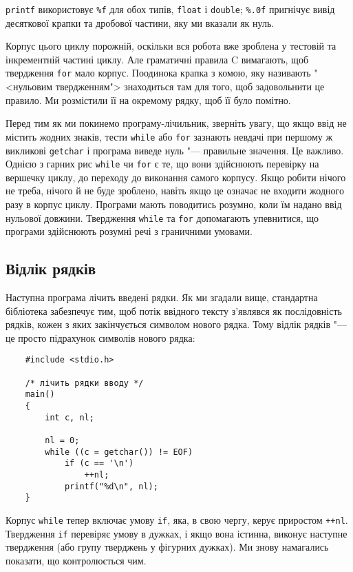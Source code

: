 \documentclass[a4paper,12pt]{book}
\begin{document}
  \texttt{printf} використовує \texttt{\%f} для обох типів, \texttt{float} і
  \texttt{double}; \texttt{\%.0f} пригнічує вивід десяткової крапки та дробової частини,
  яку ми вказали як нуль.

  Корпус цього циклу порожній, оскільки вся робота вже зроблена у тестовій та інкрементній
  частині циклу. Але граматичні правила C вимагають, щоб твердження \texttt{for} мало
  корпус. Поодинока крапка з комою, яку називають "<нульовим твердженням">
  знаходиться там для того, щоб задовольнити це правило. Ми розмістили її на окремому
  рядку, щоб її було помітно.

  Перед тим як ми покинемо програму-лічильник, зверніть увагу, що якщо ввід не містить
  жодних знаків, тести \texttt{while} або \texttt{for} зазнають невдачі при першому ж
  викликові \texttt{getchar} і програма виведе нуль "--- правильне значення. Це
  важливо. Однією з гарних рис \texttt{while} чи \texttt{for} є те, що вони здійснюють
  перевірку на вершечку циклу, до переходу до виконання самого корпусу. Якщо робити нічого
  не треба, нічого й не буде зроблено, навіть якщо це означає не входити жодного разу в
  корпус циклу. Програми мають поводитись розумно, коли їм надано ввід нульової довжини.
  Твердження \texttt{while} та \texttt{for} допомагають упевнитися, що програми здійснюють
  розумні речі з граничними умовами.

\subsection{Відлік рядків}


  Наступна програма лічить введені рядки. Як ми згадали вище, стандартна бібліотека
  забезпечує тим, щоб потік ввідного тексту з'являвся як послідовність рядків, кожен з
  яких закінчується символом нового рядка. Тому відлік рядків "--- це просто підрахунок
  символів нового рядка:
  \begin{verbatim}
    #include <stdio.h>

    /* лічить рядки вводу */
    main()
    {
        int c, nl;

        nl = 0;
        while ((c = getchar()) != EOF)
            if (c == '\n')
                ++nl;
            printf("%d\n", nl);
    }
  \end{verbatim}

  Корпус \texttt{while} тепер включає умову \texttt{if}, яка, в свою чергу, керує
  приростом \texttt{++nl}. Твердження \texttt{if} перевіряє умову в дужках, і якщо вона
  істинна, виконує наступне твердження (або групу тверджень у фігурних дужках). Ми знову
  намагались показати, що контролюється чим.
\end{document}
